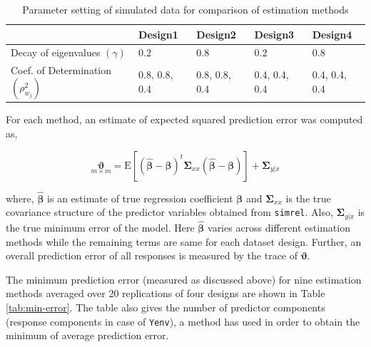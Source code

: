 \documentclass[review]{elsarticle}
\theoremstyle{definition}
\theoremstyle{definition}
\theoremstyle{definition}
\theoremstyle{remark}
\begin{document}
\begin{table}[!h]

\caption{\label{tab:parameter-settings}Parameter setting of simulated data for comparison of estimation methods}
\centering
\begin{tabular}[t]{p{}p{}p{}p{}p{}}
\toprule
  & Design1 & Design2 & Design3 & Design4\\
\midrule
Decay of eigenvalues $(\gamma)$ & 0.2 & 0.8 & 0.2 & 0.8\\
Coef. of Determination $(\rho^2_{w_j})$ & 0.8, 0.8, 0.4 & 0.8, 0.8, 0.4 & 0.4, 0.4, 0.4 & 0.4, 0.4, 0.4\\
\bottomrule
\end{tabular}
\end{table}

For each method, an estimate of expected squared prediction error was
computed as,

\[\underset{m \times m}{\boldsymbol{\vartheta}} =
\mathrm{E}\left[\left(
\hat{\boldsymbol{\beta}} - \boldsymbol{\beta}
\right) ^t \boldsymbol{\Sigma}_{xx}
\left(
\hat{\boldsymbol{\beta}} - \boldsymbol{\beta}
\right)\right] + \boldsymbol{\Sigma}_{y|x}\]

where, \(\hat{\boldsymbol{\beta}}\) is an estimate of true regression
coefficient \(\boldsymbol{\beta}\) and \(\boldsymbol{\Sigma}_{xx}\) is
the true covariance structure of the predictor variables obtained from
\texttt{simrel}. Also, \(\boldsymbol{\Sigma}_{y|x}\) is the true minimum
error of the model. Here \(\hat{\boldsymbol{\beta}}\) varies across
different estimation methods while the remaining terms are same for each
dataset design. Further, an overall prediction error of all responses is
measured by the trace of \(\boldsymbol{\vartheta}\).

The minimum prediction error (measured as discussed above) for nine
estimation methods averaged over 20 replications of four designs are
shown in Table \ref{tab:min-error}. The table also gives the number of
predictor components (response components in case of \texttt{Yenv}), a
method has used in order to obtain the minimum of average prediction
error.

\end{document}
